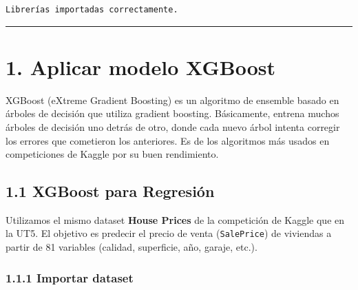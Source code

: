 \documentclass[11pt]{article}
\begin{document}
    \begin{Verbatim}[commandchars=\\\{\}]
Librerías importadas correctamente.
    \end{Verbatim}

    \begin{center}\rule{0.5\linewidth}{0.5pt}\end{center}

\section{1. Aplicar modelo XGBoost}\label{aplicar-modelo-xgboost}

XGBoost (eXtreme Gradient Boosting) es un algoritmo de ensemble basado
en árboles de decisión que utiliza gradient boosting. Básicamente,
entrena muchos árboles de decisión uno detrás de otro, donde cada nuevo
árbol intenta corregir los errores que cometieron los anteriores. Es de
los algoritmos más usados en competiciones de Kaggle por su buen
rendimiento.

    \subsection{1.1 XGBoost para Regresión}\label{xgboost-para-regresiuxf3n}

Utilizamos el mismo dataset \textbf{House Prices} de la competición de
Kaggle que en la UT5. El objetivo es predecir el precio de venta
(\texttt{SalePrice}) de viviendas a partir de 81 variables (calidad,
superficie, año, garaje, etc.).

    \subsubsection{1.1.1 Importar dataset}\label{importar-dataset}
\end{document}
